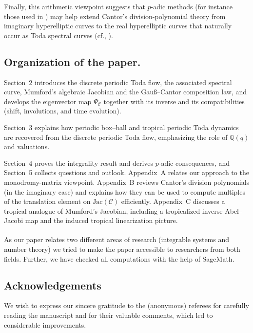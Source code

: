 \documentclass[11pt, a4paper]{amsart}
\theoremstyle{plain}
\numberwithin{equation}{section}
\begin{document}
\noindent Finally, this arithmetic viewpoint suggests that $p$-adic methods (for instance those used in \cite{eid}) may help extend Cantor's division-polynomial theory from imaginary hyperelliptic curves to the real hyperelliptic curves that naturally occur as Toda spectral curves (cf., \cite{yalkinoglu}).

\subsection{Organization of the paper.}
Section~2 introduces the discrete periodic Toda flow, the associated spectral curve, Mumford’s algebraic Jacobian and the
Gau{\ss}--Cantor composition law, and develops the eigenvector map $\Psi_\mathcal C$ together with its inverse and its compatibilities
(shift, involutions, and time evolution).

\noindent Section~3 explains how periodic box--ball and tropical periodic Toda dynamics are recovered from the discrete periodic Toda flow,
emphasizing the role of $\mathbb{Q}(q)$ and valuations.

\noindent Section~4 proves the integrality result and derives $p$-adic consequences, and Section~5 collects questions and outlook.
Appendix~A relates our approach to the monodromy-matrix viewpoint.
Appendix~B reviews Cantor’s division polynomials (in the imaginary case) and explains how they can be used to compute multiples
of the translation element on $\mathrm{Jac}(\mathcal C)$ efficiently.
Appendix~C discusses a tropical analogue of Mumford’s Jacobian,
including a tropicalized inverse Abel--Jacobi map and the induced tropical linearization picture. \\ \\
As our paper relates two different areas of research (integrable systems and number theory) we tried to make the paper accessible
to researchers from both fields. Further, we have checked all computations with the help of SageMath.


\subsection{Acknowledgements} We wish to express our sincere gratitude to the (anonymous) referees for carefully reading the manuscript and for their valuable comments, which led to considerable improvements.
\newpage
\end{document}

